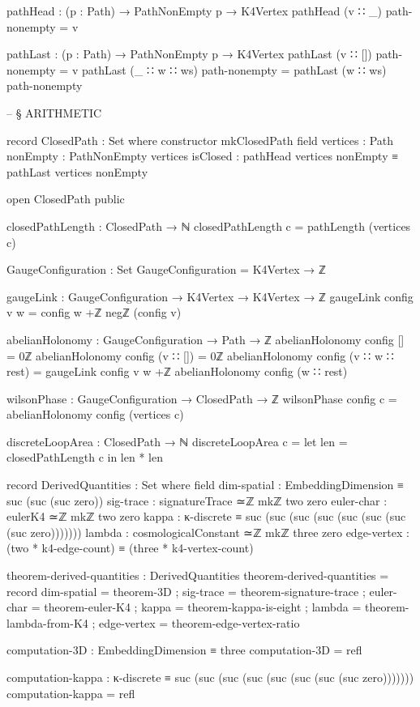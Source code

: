 \documentclass[11pt,a4paper]{book}
\begin{document}
\begin{code}
pathHead : (p : Path) → PathNonEmpty p → K4Vertex
pathHead (v ∷ _) path-nonempty = v

pathLast : (p : Path) → PathNonEmpty p → K4Vertex
pathLast (v ∷ []) path-nonempty = v
pathLast (_ ∷ w ∷ ws) path-nonempty = pathLast (w ∷ ws) path-nonempty


-- § ARITHMETIC

record ClosedPath : Set where
  constructor mkClosedPath
  field
    vertices  : Path
    nonEmpty  : PathNonEmpty vertices
    isClosed  : pathHead vertices nonEmpty ≡ pathLast vertices nonEmpty

open ClosedPath public

closedPathLength : ClosedPath → ℕ
closedPathLength c = pathLength (vertices c)

GaugeConfiguration : Set
GaugeConfiguration = K4Vertex → ℤ

gaugeLink : GaugeConfiguration → K4Vertex → K4Vertex → ℤ
gaugeLink config v w = config w +ℤ negℤ (config v)

abelianHolonomy : GaugeConfiguration → Path → ℤ
abelianHolonomy config [] = 0ℤ
abelianHolonomy config (v ∷ []) = 0ℤ
abelianHolonomy config (v ∷ w ∷ rest) = 
  gaugeLink config v w +ℤ abelianHolonomy config (w ∷ rest)

wilsonPhase : GaugeConfiguration → ClosedPath → ℤ
wilsonPhase config c = abelianHolonomy config (vertices c)

discreteLoopArea : ClosedPath → ℕ
discreteLoopArea c = 
  let len = closedPathLength c
  in len * len

record DerivedQuantities : Set where
  field
    dim-spatial    : EmbeddingDimension ≡ suc (suc (suc zero))
    sig-trace      : signatureTrace ≃ℤ mkℤ two zero
    euler-char     : eulerK4 ≃ℤ mkℤ two zero
    kappa          : κ-discrete ≡ suc (suc (suc (suc (suc (suc (suc (suc zero)))))))
    lambda         : cosmologicalConstant ≃ℤ mkℤ three zero
    edge-vertex    : (two * k4-edge-count) ≡ (three * k4-vertex-count)

theorem-derived-quantities : DerivedQuantities
theorem-derived-quantities = record
  { dim-spatial  = theorem-3D
  ; sig-trace    = theorem-signature-trace
  ; euler-char   = theorem-euler-K4
  ; kappa        = theorem-kappa-is-eight
  ; lambda       = theorem-lambda-from-K4
  ; edge-vertex  = theorem-edge-vertex-ratio
  }

computation-3D : EmbeddingDimension ≡ three
computation-3D = refl

computation-kappa : κ-discrete ≡ suc (suc (suc (suc (suc (suc (suc (suc zero)))))))
computation-kappa = refl



\end{code}
\end{document}
